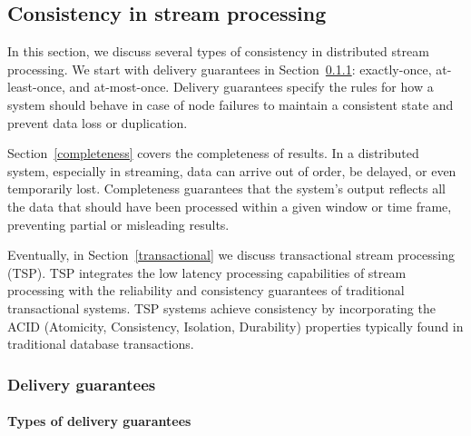 \subsection{Consistency in stream processing}

In this section, we discuss several types of consistency in distributed stream processing. We start with delivery guarantees in Section~\ref{delivery_guarantees}: exactly-once, at-least-once, and at-most-once. Delivery guarantees specify the rules for how a system should behave in case of node failures to maintain a consistent state and prevent data loss or duplication.

Section~\ref{completeness} covers the completeness of results.  In a distributed system, especially in streaming, data can arrive out of order, be delayed, or even temporarily lost. Completeness guarantees that the system's output reflects all the data that should have been processed within a given window or time frame, preventing partial or misleading results.

Eventually, in Section~\ref{transactional} we discuss transactional stream processing (TSP). TSP integrates the low latency processing capabilities of stream processing with the reliability and consistency guarantees of traditional transactional systems. TSP systems achieve consistency by incorporating the ACID (Atomicity, Consistency, Isolation, Durability) properties typically found in traditional database transactions.


\subsubsection{Delivery guarantees}
\label{delivery_guarantees}

\paragraph{Types of delivery guarantees}\mbox{} \\

